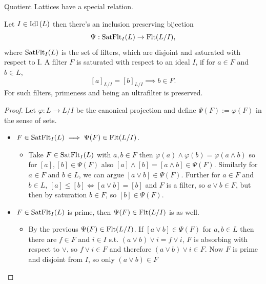 \begin{subsection}{Quotient Lattices}
    have a special relation.
    \begin{proposition} \label{filtersinidealquot}
        Let \( I \in \text{Idl}\left (L \right) \) then there's an inclusion preserving bijection 
        \[ \Psi : \textnormal{SatFlt}_{I}({L}) \to \textnormal{Flt}({L / I}), \]
        where \( \textnormal{SatFlt}_{I}({L}) \) is the set of filters, which are
        disjoint and saturated with respect to I.
        A filter \( F \) is saturated with respect to an ideal \( I \), if
        for \( a \in F \) and \( b \in L \), 
        \[ 
            [a]_{L / I} = [b]_{L / I} \implies b \in F.
        \]
        For such filters, primeness and being an ultrafilter is preserved.
    \end{proposition}
    \begin{proof}
        Let \( \varphi : L \to L / I \) be the canonical projection and define \( \Psi(F) := \varphi(F) \) in the sense of sets.
        \begin{itemize}
            \item \( F \in \textnormal{SatFlt}_{I}({L}) \implies \Psi(F) \in \textnormal{Flt}({L / I}) \).
                \begin{itemize}
                    \item 
                        Take \( F \in \textnormal{SatFlt}_{I}({L}) \) with \( a, b \in F \)
                        then \( \varphi(a) \wedge \varphi(b) = \varphi(a \wedge b) \)
                        so for \( [a], [b] \in \Psi(F) \) also \( [a] \wedge [b] = [a \wedge b] \in \Psi(F) \).
                        Similarly for \( a \in F \) and \( b \in L \), we can argue \( [a \vee b] \in \Psi(F) \).
                        Further for \( a \in F \) and \( b \in L \), \( [a] \leq [b] \iff [a \vee b] = [b] \)
                        and \( F \) is a filter, so \( a \vee b \in F \), but then by saturation \( b \in F \), so \( [b] \in \Psi(F) \).
                \end{itemize}
            \item \( F \in \textnormal{SatFlt}_{I}({L}) \) is prime, then \( \Psi(F) \in \textnormal{Flt}({L / I}) \) is as well.
                \begin{itemize}
                    \item 
                        By the previous \( \Psi(F) \in \textnormal{Flt}({L / I}) \).
                        If \([a \vee b] \in \Psi(F) \) for \( a, b \in L \) then there are \( f \in F \) and \( i \in I \)
                        s.t. \( (a \vee b) \vee i = f \vee i \), \( F \) is absorbing with respect to \( \vee \), so \( f \vee i \in F \)
                        and therefore \( (a \vee b) \vee i \in F \). Now \( F \) is prime and disjoint from \( I \), so only \( (a \vee b) \in F \)

\end{itemize}
\end{itemize}
\end{proof}
\end{subsection}
